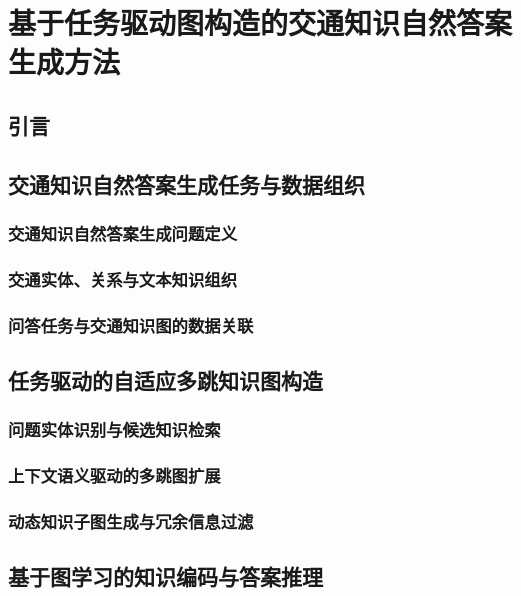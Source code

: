 
\chapter{基于任务驱动图构造的交通知识自然答案生成方法}

\section{引言}

\section{交通知识自然答案生成任务与数据组织}

\subsection{交通知识自然答案生成问题定义}

\subsection{交通实体、关系与文本知识组织}

\subsection{问答任务与交通知识图的数据关联}

\section{任务驱动的自适应多跳知识图构造}

\subsection{问题实体识别与候选知识检索}

\subsection{上下文语义驱动的多跳图扩展}

\subsection{动态知识子图生成与冗余信息过滤}

\section{基于图学习的知识编码与答案推理}

